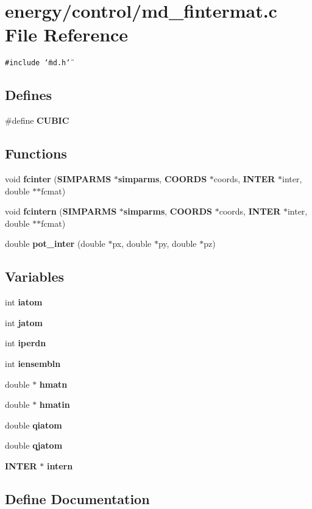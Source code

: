\section{energy/control/md\_\-fintermat.c File Reference}
\label{md__fintermat_8c}
{\tt \#include \char`\"{}md.h\char`\"{}}\par
\subsection*{Defines}
\begin{CompactItemize}
\item 
\#define {\bf CUBIC}
\end{CompactItemize}
\subsection*{Functions}
\begin{CompactItemize}
\item 
void {\bf fcinter} ({\bf SIMPARMS} $\ast${\bf simparms}, {\bf COORDS} $\ast$coords, {\bf INTER} $\ast$inter, double $\ast$$\ast$fcmat)
\item 
void {\bf fcintern} ({\bf SIMPARMS} $\ast${\bf simparms}, {\bf COORDS} $\ast$coords, {\bf INTER} $\ast$inter, double $\ast$$\ast$fcmat)
\item 
double {\bf pot\_\-inter} (double $\ast$px, double $\ast$py, double $\ast$pz)
\end{CompactItemize}
\subsection*{Variables}
\begin{CompactItemize}
\item 
int {\bf iatom}
\item 
int {\bf jatom}
\item 
int {\bf iperdn}
\item 
int {\bf iensembln}
\item 
double $\ast$ {\bf hmatn}
\item 
double $\ast$ {\bf hmatin}
\item 
double {\bf qiatom}
\item 
double {\bf qjatom}
\item 
{\bf INTER} $\ast$ {\bf intern}
\end{CompactItemize}


\subsection{Define Documentation}
